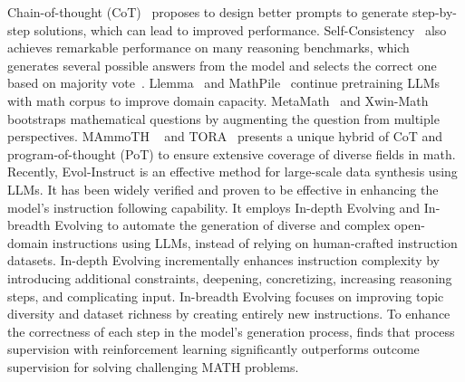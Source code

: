 Chain-of-thought (CoT)~\citep{wei2022chain} proposes to design better prompts to  generate step-by-step solutions, which can lead to improved performance. Self-Consistency~\citep{wang2023selfconsistency} also achieves remarkable performance on many reasoning benchmarks, which generates several possible answers from the model and selects the correct one based on majority vote~\citep{fu2023complexity-cot-based}. Llemma~\citep{azerbayev2023llemma} and MathPile~\citep{wang2023generative} continue pretraining LLMs with math corpus to improve domain capacity. MetaMath~\citep{yu2023metamath} and Xwin-Math~\citep{li2024-Xwin-math} bootstraps mathematical questions by augmenting the question from multiple perspectives. MAmmoTH ~\citep{yue2023mammoth} and TORA~\citep{gou2023tora} presents a unique hybrid of CoT and program-of-thought (PoT) to ensure extensive coverage of diverse fields in math. Recently, Evol-Instruct is an effective method for large-scale data synthesis using LLMs. It has been widely verified and proven to be effective in enhancing the model's instruction following capability. It employs In-depth Evolving and In-breadth Evolving to automate the generation of diverse and complex open-domain instructions using LLMs, instead of relying on human-crafted instruction datasets. In-depth Evolving incrementally enhances instruction complexity by introducing additional constraints, deepening, concretizing, increasing reasoning steps, and complicating input. In-breadth Evolving focuses on improving topic diversity and dataset richness by creating entirely new instructions.  To enhance the correctness of each step in the model's generation process, \citep{wang2024-mathshepherd,chen2024-autoprm, lightman2023openai-verify-step-by-step} finds that process supervision with reinforcement learning significantly outperforms outcome supervision for solving challenging MATH problems.

